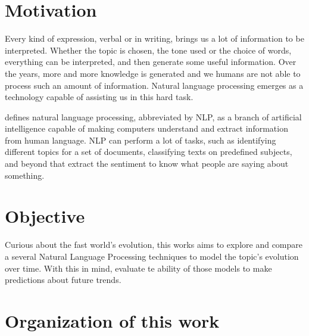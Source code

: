 
\section{Motivation}

Every kind of expression, verbal or in writing, brings us a lot of information to be interpreted. Whether the topic is chosen, the tone used or the choice of words, everything can be interpreted, and then generate some useful information. Over the years, more and more knowledge is generated and we humans are not able to process such an amount of information. Natural language processing emerges as a technology capable of assisting us in this hard task.

 defines natural language processing, abbreviated by NLP, as a branch of artificial intelligence capable of making computers understand and extract information from human language. NLP can perform a lot of tasks, such as identifying different topics for a set of documents, classifying texts on predefined subjects, and beyond that extract the sentiment to know what people are saying about something.

% 

\section{Objective}

Curious about the fast world's evolution, this works aims to explore and compare a several Natural Language Processing techniques to model the topic's evolution over time. With this in mind, evaluate te ability of those models to make predictions about future trends.


\section{Organization of this work}

